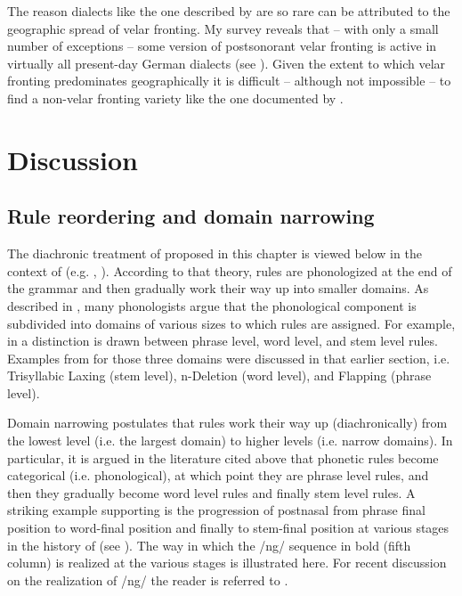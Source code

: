 The reason dialects like the one described by \citet{Janiczek1911} are so rare can be attributed to the geographic spread of velar fronting. My survey reveals that -- with only a small number of exceptions -- some version of postsonorant velar fronting is active in virtually all present-day German dialects (see ). Given the extent to which velar fronting predominates geographically it is difficult -- although not impossible -- to find a non-velar fronting variety like the one documented by \citet{Janiczek1911}.

\section{{Discussion}}\label{sec:5.5}

\subsection{Rule reordering and domain narrowing}\label{sec:5.5.1}

The diachronic treatment of   proposed in this chapter is viewed below in the context of  (e.g. \citealt{Bermúdez-Otero2007,Bermúdez-Otero2015,Bermúdez-Otero2007}, \citealt{Ramsammy2015}). According to that theory, rules are phonologized at the end of the grammar and then gradually work their way up into smaller domains. As described in , many phonologists argue that the phonological component is subdivided into domains of various sizes to which rules are assigned. For example, in  a distinction is drawn between phrase level, word level, and stem level rules. Examples from   for those three domains were discussed in that earlier section, i.e. Trisyllabic Laxing (stem level), n-Deletion (word level), and Flapping (phrase level). 

Domain narrowing postulates that rules work their way up (diachronically) from the lowest level (i.e. the largest domain) to higher levels (i.e. narrow domains). In particular, it is argued in the literature cited above that phonetic rules become categorical (i.e. phonological), at which point they are phrase level rules, and then they gradually become word level rules and finally stem level rules. A striking example \citep{Bermúdez-Otero2015} supporting  is the progression of postnasal  from phrase final position to word-final position and finally to stem-final position at various stages in the history of  (see ). The way in which the /ng/ sequence in bold (fifth column) is realized at the various stages is illustrated here. For recent discussion on the realization of /ng/ the reader is referred to \citet{Bailey2021}.

